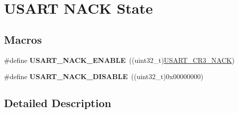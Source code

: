 \hypertarget{group___u_s_a_r_t___n_a_c_k___state}{}\section{U\+S\+A\+RT N\+A\+CK State}
\label{group___u_s_a_r_t___n_a_c_k___state}
\subsection*{Macros}
\begin{DoxyCompactItemize}
\item 
\#define {\bfseries U\+S\+A\+R\+T\+\_\+\+N\+A\+C\+K\+\_\+\+E\+N\+A\+B\+LE}~((uint32\+\_\+t)\hyperlink{group___peripheral___registers___bits___definition_ga3f3b70b2ee9ff0b59e952fd7ab04373c}{U\+S\+A\+R\+T\+\_\+\+C\+R3\+\_\+\+N\+A\+CK})\hypertarget{group___u_s_a_r_t___n_a_c_k___state_ga89002469e32e3a236d534eac7db048eb}{}\label{group___u_s_a_r_t___n_a_c_k___state_ga89002469e32e3a236d534eac7db048eb}

\item 
\#define {\bfseries U\+S\+A\+R\+T\+\_\+\+N\+A\+C\+K\+\_\+\+D\+I\+S\+A\+B\+LE}~((uint32\+\_\+t)0x00000000)\hypertarget{group___u_s_a_r_t___n_a_c_k___state_gac92ccec5e433d1707f71f51f49a6ccc7}{}\label{group___u_s_a_r_t___n_a_c_k___state_gac92ccec5e433d1707f71f51f49a6ccc7}

\end{DoxyCompactItemize}


\subsection{Detailed Description}
